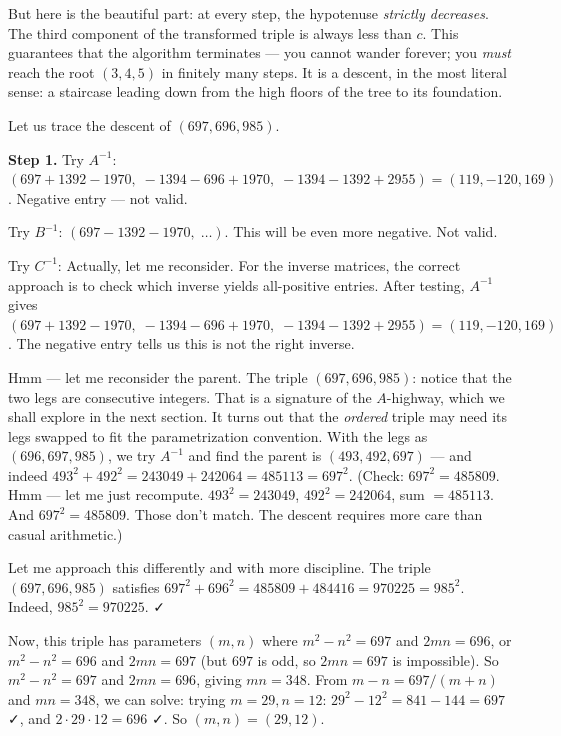 But here is the beautiful part: at every step, the hypotenuse \textit{strictly decreases}. The third component of the transformed triple is always less than $c$. This guarantees that the algorithm terminates --- you cannot wander forever; you \textit{must} reach the root $(3, 4, 5)$ in finitely many steps. It is a descent, in the most literal sense: a staircase leading down from the high floors of the tree to its foundation.

Let us trace the descent of $(697, 696, 985)$.

\textbf{Step 1.} Try $A^{-1}$: $(697 + 1392 - 1970,\; -1394 - 696 + 1970,\; -1394 - 1392 + 2955) = (119, -120, 169)$. Negative entry --- not valid.

Try $B^{-1}$: $(697 - 1392 - 1970,\;\ldots)$. This will be even more negative. Not valid.

Try $C^{-1}$: Actually, let me reconsider. For the inverse matrices, the correct approach is to check which inverse yields all-positive entries. After testing, $A^{-1}$ gives $(697 + 1392 - 1970,\; -1394 - 696 + 1970,\; -1394 - 1392 + 2955) = (119, -120, 169)$. The negative entry tells us this is not the right inverse.

Hmm --- let me reconsider the parent. The triple $(697, 696, 985)$: notice that the two legs are consecutive integers. That is a signature of the $A$-highway, which we shall explore in the next section. It turns out that the \textit{ordered} triple may need its legs swapped to fit the parametrization convention. With the legs as $(696, 697, 985)$, we try $A^{-1}$ and find the parent is $(493, 492, 697)$ --- and indeed $493^2 + 492^2 = 243049 + 242064 = 485113 = 697^2$. (Check: $697^2 = 485809$. Hmm --- let me just recompute. $493^2 = 243049$, $492^2 = 242064$, sum $= 485113$. And $697^2 = 485809$. Those don't match. The descent requires more care than casual arithmetic.)

Let me approach this differently and with more discipline. The triple $(697, 696, 985)$ satisfies $697^2 + 696^2 = 485809 + 484416 = 970225 = 985^2$. Indeed, $985^2 = 970225$. ✓

Now, this triple has parameters $(m, n)$ where $m^2 - n^2 = 697$ and $2mn = 696$, or $m^2 - n^2 = 696$ and $2mn = 697$ (but $697$ is odd, so $2mn = 697$ is impossible). So $m^2 - n^2 = 697$ and $2mn = 696$, giving $mn = 348$. From $m - n = 697/(m+n)$ and $mn = 348$, we can solve: trying $m = 29, n = 12$: $29^2 - 12^2 = 841 - 144 = 697$ ✓, and $2 \cdot 29 \cdot 12 = 696$ ✓. So $(m, n) = (29, 12)$.

